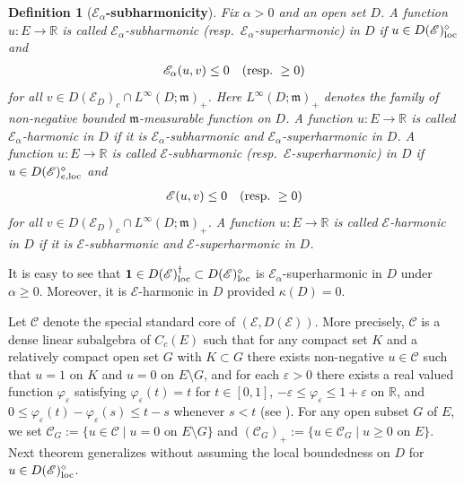 \documentclass[12pt,a4paper]{article}
\newtheorem{defn}[thm]{Definition}
\newcommand{\R}{\mathbb{R}}
\newcommand{\m}{\mathfrak{m} }
\newcommand{\loc}{{\rm loc}}
\newcommand{\1}{{\bf 1}}
\begin{document}
\begin{defn}[{{\bf {\boldmath$\mathscr{E}_{\alpha}$}-subharmonicity}}]\label{df:subharmonicity}
{\rm Fix $\alpha>0$ and an open set $D$. A function $u:E\to\R$ is called \emph{$\mathscr{E}_{\alpha}$-subharmonic} (resp.~\emph{$\mathscr{E}_{\alpha}$-superharmonic}) \emph{in $D$} if $u\in 
D(\mathscr{E})_{\loc}^{\diamond}$ 
and 
\begin{align}
\mathscr{E}_{\alpha}(u,v)\leq0\quad \text{\rm (resp.~}\geq0\text{\rm )}\label{eq:Subharmonicity}
\end{align}  
for all $v\in D(\mathscr{E}_D)_c\cap L^{\infty}(D;{\m})_+$. 
Here $L^{\infty}(D;{\m})_+$ denotes the family of non-negative bounded ${\m}$-measurable function on $D$. 
A function $u:E\to\R$ is called \emph{$\mathscr{E}_{\alpha}$-harmonic in $D$} if it is 
 $\mathscr{E}_{\alpha}$-subharmonic and $\mathscr{E}_{\alpha}$-superharmonic in $D$. 
A function $u:E\to\R$ is called \emph{$\mathscr{E}$-subharmonic} (resp.~\emph{$\mathscr{E}$-superharmonic}) \emph{in $D$} if $u\in 
D(\mathscr{E})_{e,\loc}^{\diamond}$ 
and 
\begin{align}
\mathscr{E}(u,v)\leq0\quad \text{\rm (resp.~}\geq0\text{\rm )}\label{eq:Subharmonicity*}
\end{align}  
for all $v\in D(\mathscr{E}_D)_c\cap L^{\infty}(D;{\m})_+$. 
A function $u:E\to\R$ is called \emph{$\mathscr{E}$-harmonic in $D$} if it is 
 $\mathscr{E}$-subharmonic and $\mathscr{E}$-superharmonic in $D$. 
}
\end{defn} 
It is easy to see that $\1\in 
D(\mathscr{E})_{\loc}^{\dag}\subset 
D(\mathscr{E})_{\loc}^{\diamond}$ is $\mathscr{E}_{\alpha}$-superharmonic in $D$ under $\alpha\geq0$. Moreover, it is $\mathscr{E}$-harmonic in $D$ provided $\kappa(D)=0$. 
 

Let $\mathscr{C}$ denote the special standard core of $(\mathscr{E},D(\mathscr{E}))$. More precisely, $\mathscr{C}$ is a dense linear subalgebra of $C_c(E)$ such that for any compact set $K$ and a relatively compact open set $G$ with $K\subset G$ there exists non-negative 
$u\in\mathscr{C}$ such that $u=1$ on $K$ and $u=0$ on $E\setminus G$,   
and for each $\varepsilon>0$ there exists a real valued function $\varphi_{\varepsilon}$ satisfying $\varphi_{\varepsilon}(t)=t$ for $t\in[0,1]$, $-\varepsilon\leq\varphi_{\varepsilon}\leq 1+\varepsilon$ on $\R$, and $0\leq \varphi_{\varepsilon}(t)-\varphi_{\varepsilon}(s)\leq t-s$ 
whenever $s<t$ (see \cite[p.~6]{FOT}). For any open subset $G$ of $E$, we set 
$\mathscr{C}_G:=\{u\in\mathscr{C}\mid u=0\text{ on }E\setminus G\}$ and 
$(\mathscr{C}_G)_+:=\{u\in\mathscr{C}_G\mid u\geq0\text{ on }E\}$.
Next theorem generalizes \cite[Theorem~2.8]{CK} without assuming the local boundedness on $D$ for $u\in 
D(\mathscr{E})_{\loc}^{\diamond}$. 
\end{document}
